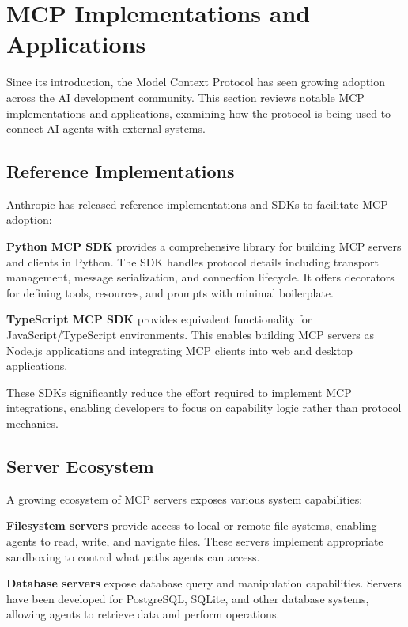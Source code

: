 \section{MCP Implementations and Applications}
\label{sec:mcp-implementations}

Since its introduction, the Model Context Protocol has seen growing adoption across the AI development community. This section reviews notable MCP implementations and applications, examining how the protocol is being used to connect AI agents with external systems.

\subsection{Reference Implementations}

Anthropic has released reference implementations and SDKs to facilitate MCP adoption:

\textbf{Python MCP SDK} provides a comprehensive library for building MCP servers and clients in Python. The SDK handles protocol details including transport management, message serialization, and connection lifecycle. It offers decorators for defining tools, resources, and prompts with minimal boilerplate.

\textbf{TypeScript MCP SDK} provides equivalent functionality for JavaScript/TypeScript environments. This enables building MCP servers as Node.js applications and integrating MCP clients into web and desktop applications.

These SDKs significantly reduce the effort required to implement MCP integrations, enabling developers to focus on capability logic rather than protocol mechanics.

\subsection{Server Ecosystem}

A growing ecosystem of MCP servers exposes various system capabilities:

\textbf{Filesystem servers} provide access to local or remote file systems, enabling agents to read, write, and navigate files. These servers implement appropriate sandboxing to control what paths agents can access.

\textbf{Database servers} expose database query and manipulation capabilities. Servers have been developed for PostgreSQL, SQLite, and other database systems, allowing agents to retrieve data and perform operations.

